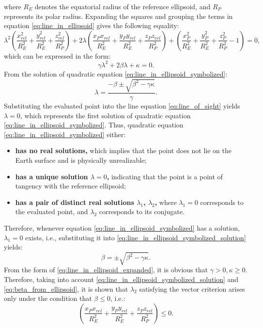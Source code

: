 where $R_E$ denotes the equatorial radius of the reference ellipsoid, and $R_P$ represents its polar radius. 
Expanding the squares and grouping the terms in equation \eqref{eq:line_in_ellipsoid} gives the following equality:
\begin{equation}\label{eq:line_in_ellipsoid_expanded}
    \lambda^2(\frac{x_{rel}^2}{R_E^2}+\frac{y_{rel}^2}{R_E^2}+\frac{z_{rel}^2}{R_P^2})
    +2\lambda (\frac{x_{P}x_{rel}}{R_E^2}+\frac{y_{P}y_{rel}}{R_E^2}+\frac{z_{P}z_{rel}}{R_P^2}) + (\frac{x_{P}^2}{R_E^2}+\frac{y_{P}^2}{R_E^2}+\frac{z_{P}^2}{R_P^2} - 1) = 0,
\end{equation}
which can be expressed in the form:
\begin{equation}\label{eq:line_in_ellipsoid_symbolized}
    \gamma \lambda^2+2\beta\lambda + \kappa = 0.  
\end{equation}
From the solution of quadratic equation \eqref{eq:line_in_ellipsoid_symbolized}:
\begin{equation}\label{eq:line_in_ellipsoid_symbolized_solution}
    \lambda = \frac{-\beta \pm \sqrt{\beta^2-\gamma\kappa}}{\gamma}. 
\end{equation}
Substituting the evaluated point into the line equation \eqref{eq:line_of_sight} yields $\lambda = 0$, which represents the first solution of quadratic equation \eqref{eq:line_in_ellipsoid_symbolized}. 
Thus, quadratic equation \eqref{eq:line_in_ellipsoid_symbolized} either:
\begin{itemize}
\item \textbf{has no real solutions,} which implies that the point does not lie on the Earth surface and is physically unrealizable;
\item \textbf{has a unique solution $\lambda = 0$,} indicating that the point is a point of tangency with the reference ellipsoid;
\item \textbf{has a pair of distinct real solutions $\lambda_1$, $\lambda_2$,} where $\lambda_1 = 0$ corresponds to the evaluated point, and $\lambda_2$ corresponds to its conjugate. 
\end{itemize}
Therefore, whenever equation \eqref{eq:line_in_ellipsoid_symbolized} has a solution, $\lambda_1 = 0$ exists, i.e., substituting it into \eqref{eq:line_in_ellipsoid_symbolized_solution} yields:
\begin{equation}\label{eq:beta_from_ellipsoid}
    \beta = \pm \sqrt{\beta^2 - \gamma\kappa}. 
\end{equation}
From the form of \eqref{eq:line_in_ellipsoid_expanded}, it is obvious that $\gamma>0,\kappa\geq0$. Therefore, taking into account \eqref{eq:line_in_ellipsoid_symbolized_solution} and \eqref{eq:beta_from_ellipsoid}, 
it is shown that $\lambda_2$ satisfying the vector criterion arises only under the condition that $\beta \leq 0$, i.e.:
\begin{equation}\label{eq:vector_coverage_criterion}
    (\frac{x_{P}x_{rel}}{R_E^2}+\frac{y_{P}y_{rel}}{R_E^2}+\frac{z_{P}z_{rel}}{R_P^2}) \leq 0.
\end{equation}

